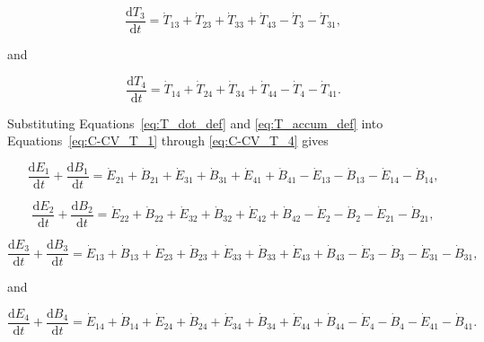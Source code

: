 \begin{equation} \label{eq:C-CV_T_3}
	\frac{\mathrm{d}T_{3}}{\mathrm{d}t} 	 
	= \dot{T}_{13} 
	+ \dot{T}_{23}
	+ \dot{T}_{33} 
	+ \dot{T}_{43} 
	- \dot{T}_{3} 
	- \dot{T}_{31},
\end{equation}

\noindent and 

\begin{equation} \label{eq:C-CV_T_4}
	\frac{\mathrm{d}T_{4}}{\mathrm{d}t} 	 
	= \dot{T}_{14} 
	+ \dot{T}_{24}
	+ \dot{T}_{34} 
	+ \dot{T}_{44} 
	- \dot{T}_{4} 
	- \dot{T}_{41}.
\end{equation}

Substituting Equations~\ref{eq:T_dot_def} 
and \ref{eq:T_accum_def} into 
Equations~\ref{eq:C-CV_T_1} through
\ref{eq:C-CV_T_4} gives

\begin{equation} \label{eq:C-CV_dB_1}
	\frac{\mathrm{d}E_{1}}{\mathrm{d}t}
	+ \frac{\mathrm{d}B_{1}}{\mathrm{d}t}
	= \dot{E}_{21} 
	+ \dot{B}_{21} 
	+ \dot{E}_{31} 
	+ \dot{B}_{31} 
	+ \dot{E}_{41} 
	+ \dot{B}_{41} 
	- \dot{E}_{13} 
	- \dot{B}_{13} 
	- \dot{E}_{14} 
	- \dot{B}_{14},
\end{equation}

\begin{equation} \label{eq:C-CV_dB_2}
	\frac{\mathrm{d}E_{2}}{\mathrm{d}t} 
	+ \frac{\mathrm{d}B_{2}}{\mathrm{d}t} 	 
	= \dot{E}_{22}
	+ \dot{B}_{22}
	+ \dot{E}_{32} 
	+ \dot{B}_{32} 
	+ \dot{E}_{42} 
	+ \dot{B}_{42} 
	- \dot{E}_{2}
	- \dot{B}_{2}
	- \dot{E}_{21} 
	- \dot{B}_{21},
\end{equation}

\begin{equation} \label{eq:C-CV_dB_3}
	\frac{\mathrm{d}E_{3}}{\mathrm{d}t} 
	+ \frac{\mathrm{d}B_{3}}{\mathrm{d}t} 	 
	= \dot{E}_{13} 
	+ \dot{B}_{13} 
	+ \dot{E}_{23}
	+ \dot{B}_{23}
	+ \dot{E}_{33} 
	+ \dot{B}_{33} 
	+ \dot{E}_{43} 
	+ \dot{B}_{43} 
	- \dot{E}_{3} 
	- \dot{B}_{3} 
	- \dot{E}_{31} 
	- \dot{B}_{31},
\end{equation}

\noindent and 

\begin{equation} \label{eq:C-CV_dB_4}
	\frac{\mathrm{d}E_{4}}{\mathrm{d}t} 
	+ \frac{\mathrm{d}B_{4}}{\mathrm{d}t} 	 
	= \dot{E}_{14} 
	+ \dot{B}_{14}
	+ \dot{E}_{24} 
	+ \dot{B}_{24} 
	+ \dot{E}_{34} 
	+ \dot{B}_{34}
	+ \dot{E}_{44} 
	+ \dot{B}_{44} 
	- \dot{E}_{4} 
	- \dot{B}_{4} 
	- \dot{E}_{41} 
	- \dot{B}_{41}.
\end{equation}

